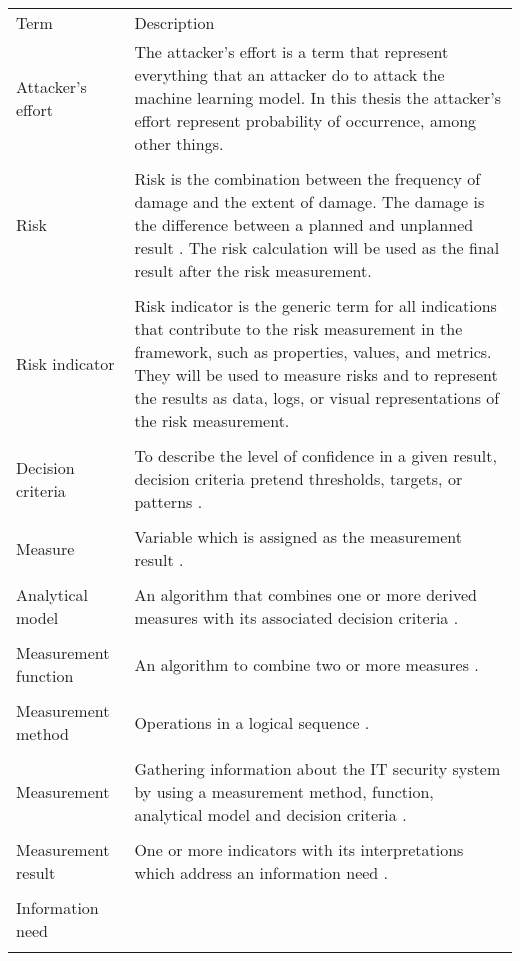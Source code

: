 \begin{center}
  \begin{tabular}{ |L{4cm}|L{10cm}|  }
    \hline
     Term & Description \\ [0.5ex]
    Attacker's effort & The attacker's effort is a term that represent everything that an attacker do to attack the machine learning model. In this thesis the attacker's effort represent probability of occurrence, among other things. \\
    & \\
    \hline
    Risk & Risk is the combination between the frequency of damage and
    the extent of damage. The damage is the difference between a
    planned and unplanned result \cite{bsi_glossar_2021}. The risk calculation will be used as the final result after the risk measurement. \\
    & \\
    \hline
    Risk indicator & Risk indicator is the generic term for all indications that contribute to the risk measurement in the framework, such as properties, values, and metrics. They will be used to measure risks and to represent the results as data, logs, or visual representations of the risk measurement. \\
    & \\
    \hline
    Decision criteria & To describe the level of confidence in a given result, decision criteria pretend thresholds, targets, or patterns \cite{ISO_27004_2009}. \\
    & \\
    \hline
    Measure & Variable which is assigned as the measurement result \cite{ISO_27004_2009}. \\
    & \\
    \hline
    Analytical model & An algorithm that combines one or more derived measures with its associated decision criteria \cite{ISO_27004_2009}. \\
    & \\
    \hline
    Measurement function & An algorithm to combine two or more measures \cite{ISO_27004_2009}. \\
    & \\
    \hline
    Measurement method & Operations in a logical sequence \cite{ISO_27004_2009}. \\
    & \\
    \hline
    Measurement & Gathering information about the IT security system by using a measurement method, function, analytical model and decision criteria \cite{ISO_27004_2009}. \\
    & \\
    \hline
    Measurement result & One or more indicators with its interpretations which address an information need \cite{ISO_27004_2009}. \\
    & \\
    \hline
    Information need & \\
    & \\
    \hline
  \end{tabular}
\end{center}

